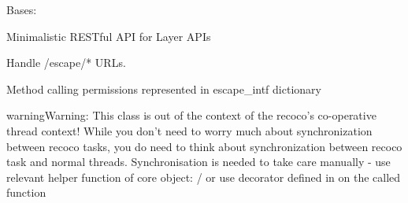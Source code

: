\documentclass[letterpaper,10pt,english]{sphinxmanual}
\begin{document}

\begin{fulllineitems}
\label{util/api:escape.util.api.AbstractRequestHandler}
Bases: \href{https://docs.python.org/2.7/library/basehttpserver.html\#BaseHTTPServer.BaseHTTPRequestHandler}{}

Minimalistic RESTful API for Layer APIs

Handle /escape/* URLs.

Method calling permissions represented in escape\_intf dictionary

\begin{notice}{warning}{Warning:}
This class is out of the context of the recoco's co-operative thread
context! While you don't need to worry much about synchronization between
recoco tasks, you do need to think about synchronization between recoco task
and normal threads. Synchronisation is needed to take care manually - use
relevant helper function of core object: /
 or use {\hyperref[util/misc:escape.util.misc.schedule_as_coop_task]{\emph{}}} decorator defined in
{\hyperref[util/misc:module-escape.util.misc]{\emph{}}} on the called function
\end{notice}

\begin{fulllineitems}
\label{util/api:escape.util.api.AbstractRequestHandler.server_version}
\end{fulllineitems}


\begin{fulllineitems}
\label{util/api:escape.util.api.AbstractRequestHandler.static_prefix}
\end{fulllineitems}


\begin{fulllineitems}
\label{util/api:escape.util.api.AbstractRequestHandler.request_perm}
\end{fulllineitems}


\end{fulllineitems}
\end{document}

